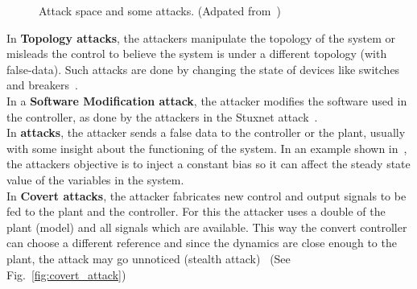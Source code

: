 \documentclass[../main.tex]{subfiles}
\begin{document}
\begin{figure}[h]
  \caption[Attack space and some attacks.]{Attack space and some attacks. (Adpated from~\cite{TeixeiraEtAl2015})}\label{fig:3_dimensions_attack_with_attacks}
\end{figure}


In \textbf{Topology attacks}, the attackers manipulate the topology of the system or misleads the control to believe the system is under a different topology (with false-data). Such attacks are done by changing the state of devices like switches and breakers~\cite{KimTong2013,WuEtAl2016,ZhangEtAl2021b}.
\\In a \textbf{Software Modification attack}, the attacker modifies the software used in the controller, as done by the attackers in the Stuxnet attack~\cite{Langner2011}.
\\In \textbf{\fdi{} attacks}, the attacker sends a false data to the controller or the plant, usually with some insight about the functioning of the system.
In an example shown in~\cite{TeixeiraEtAl2015}, the attackers objective is to inject a constant bias so it can affect the steady state value of the variables in the system.
\\In \textbf{Covert attacks}, the attacker fabricates new control and output signals to be fed to the plant and the controller.
For this the attacker uses a double of the plant (model) and all signals which are available.
This way the convert controller can choose a different reference and since the dynamics are close enough to the plant, the attack may go unnoticed (stealth attack)~\cite{Smith2015,HoehnZhang2016,BarboniEtAl2020} (See Fig.~\ref{fig:covert_attack})
\end{document}
